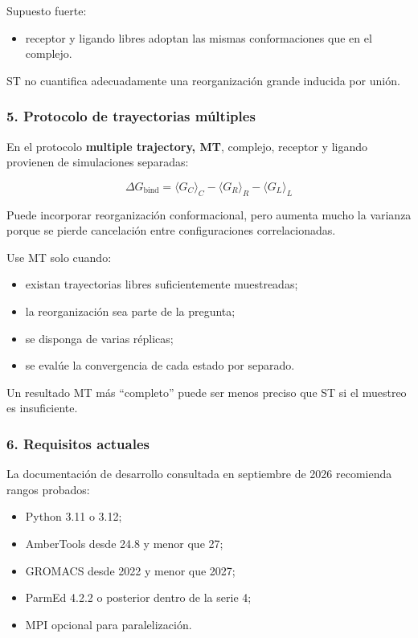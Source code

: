 \documentclass[
  spanish,
  11pt,
  a4paper]{article}
\providecommand{\tightlist}{%
  \setlength{\itemsep}{0pt}\setlength{\parskip}{0pt}}
\begin{document}
Supuesto fuerte:

\begin{itemize}
\tightlist
\item
  receptor y ligando libres adoptan las mismas conformaciones que en el
  complejo.
\end{itemize}

ST no cuantifica adecuadamente una reorganización grande inducida por
unión.

\subsubsection{5. Protocolo de trayectorias
múltiples}\label{protocolo-de-trayectorias-muxfaltiples}

En el protocolo \textbf{multiple trajectory, MT}, complejo, receptor y
ligando provienen de simulaciones separadas:

\[
\Delta G_{\mathrm{bind}}
=
\langle G_C\rangle_C
-
\langle G_R\rangle_R
-
\langle G_L\rangle_L
\]

Puede incorporar reorganización conformacional, pero aumenta mucho la
varianza porque se pierde cancelación entre configuraciones
correlacionadas.

Use MT solo cuando:

\begin{itemize}
\tightlist
\item
  existan trayectorias libres suficientemente muestreadas;
\item
  la reorganización sea parte de la pregunta;
\item
  se disponga de varias réplicas;
\item
  se evalúe la convergencia de cada estado por separado.
\end{itemize}

Un resultado MT más ``completo'' puede ser menos preciso que ST si el
muestreo es insuficiente.

\subsubsection{6. Requisitos actuales}\label{requisitos-actuales}

La documentación de desarrollo consultada en septiembre de 2026
recomienda rangos probados:

\begin{itemize}
\tightlist
\item
  Python 3.11 o 3.12;
\item
  AmberTools desde 24.8 y menor que 27;
\item
  GROMACS desde 2022 y menor que 2027;
\item
  ParmEd 4.2.2 o posterior dentro de la serie 4;
\item
  MPI opcional para paralelización.
\end{itemize}
\end{document}
